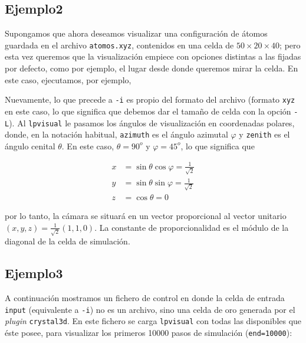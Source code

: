 \subsection{Ejemplo2}

Supongamos que ahora deseamos visualizar una configuraci\'on de \'atomos guardada en el archivo \verb+atomos.xyz+, contenidos en una celda de $50\times20\times40$; pero esta vez queremos que la visualizaci\'on empiece con opciones distintas a las fijadas por defecto, como por ejemplo, el lugar desde donde queremos mirar la celda. En este caso, ejecutamos, por ejemplo,


Nuevamente, lo que precede a \verb+-i+ es propio del formato del archivo (formato \verb+xyz+ en este caso, lo que significa que debemos dar el tama\~no de celda con la opci\'on \verb+-L+). Al \verb+lpvisual+ le pasamos los \'angulos de visualizaci\'on en coordenadas polares, donde, en la notaci\'on habitual, \verb+azimuth+ es el \'angulo azimutal $\varphi$ y \verb+zenith+ es el \'angulo cenital $\theta$. En este caso, $\theta=90^o$ y $\varphi=45^o$, lo que significa que

\begin{align}
x&=\sin\theta\cos\varphi=\frac1{\sqrt2}\\
y&=\sin\theta\sin\varphi=\frac1{\sqrt2}\\
z&=\cos\theta=0
\end{align}

por lo tanto, la c\'amara se situar\'a en un vector proporcional al vector unitario $(x,y,z)=\frac{1}{\sqrt2}(1,1,0)$. La constante de proporcionalidad es el m\'odulo de la diagonal de la celda de simulaci\'on.


\subsection{Ejemplo3}

A continuaci\'on mostramos un fichero de control en donde la celda de entrada \verb+input+ (equivalente a \verb+-i+) no es un archivo, sino una celda de oro generada por el \emph{plugin} \verb+crystal3d+. En este fichero se carga \verb+lpvisual+ con todas las disponibles que \'este posee, para visualizar los primeros 10000 pasos de simulaci\'on (\verb+end=10000+):


